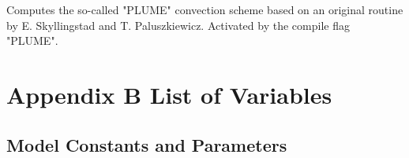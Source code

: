 Computes the so-called "PLUME" convection scheme
based on an original routine by E. Skyllingstad and T. Paluszkiewicz.
Activated by the compile flag "PLUME". 


\newpage
\section{Appendix B \hspace{0.5cm} List of Variables}
\label{sec:appendix:los}

\subsection{Model Constants and Parameters}



